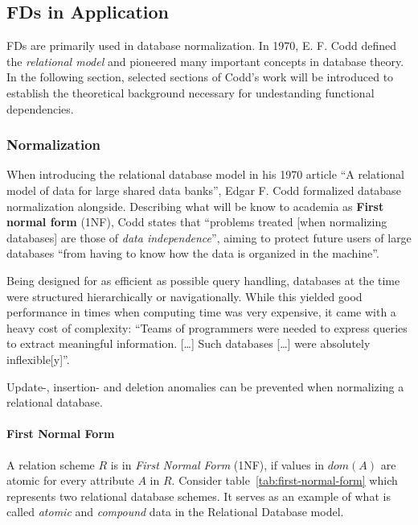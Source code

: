 \subsection{FDs in Application}
FDs are primarily used in database normalization.\cite[p.~1]{CAR16}
In 1970, E. F. Codd defined the \emph{relational model}\cite{COD70} and pioneered many important concepts in database theory.
In the following section, selected sections of Codd's work will be introduced to establish the theoretical background necessary for undestanding functional dependencies.

\subsubsection{Normalization}
When introducing the relational database model in his 1970 article ``A relational model of data for large shared data banks'', Edgar F. Codd formalized database normalization alongside.\cite{COD70}
Describing what will be know to academia as \textbf{First normal form} (1NF), Codd states that ``problems treated [when normalizing databases] are those of \emph{data independence}'', aiming to protect future users of large databases ``from having to know how the data is organized in the machine''. \cite[p.~1]{COD70}

Being designed for as efficient as possible query handling, databases at the time were structured hierarchically or navigationally.
While this yielded good performance in times when computing time was very expensive, it came with a heavy cost of complexity:
``Teams of programmers were needed to express queries to extract meaningful information. [\dots] Such databases [\dots] were absolutely inflexible[y]''.\cite{IBM03}

Update-, insertion- and deletion anomalies can be prevented when normalizing a relational database. \cite[p.~75]{KLE11}

\paragraph{First Normal Form}
A relation scheme $R$ is in \emph{First Normal Form} (1NF), if values in \(dom(A)\) are atomic for every attribute \(A\) in \(R\). \cite[p.~96]{MAI83}
Consider table~\ref{tab:first-normal-form} which represents two relational database schemes.
It serves as an example of what is called \emph{atomic} and \emph{compound} data in the Relational Database model. \cite[p.~6]{COD90}

